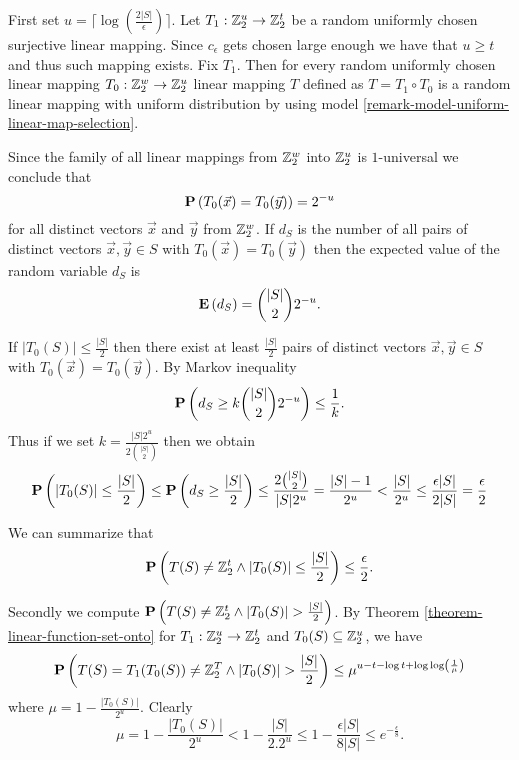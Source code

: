 First set $u = \lceil\log(\frac {2|S|}{\epsilon})\rceil$. Let $T_1: \mathbb{Z}_{2}^{u} \rightarrow \mathbb{Z}_{2}^{t}$ be a random uniformly chosen surjective linear mapping. Since $c_\epsilon$ gets chosen large enough we have that $u \geq t$ and thus such mapping exists.  Fix $T_1$. Then for every random uniformly chosen linear mapping $T_0: \mathbb{Z}_{2}^{w} \rightarrow \mathbb{Z}_{2}^{u}$ linear mapping $T$ defined as $T = T_1 \circ T_0$  is a random linear mapping with uniform distribution by using model \ref{remark-model-uniform-linear-map-selection}. 

Since the family of all linear mappings from $\mathbb{Z}_{2}^{w}$ into $\mathbb{Z}_{2}^{u}$ is $1$-universal we conclude that \[ \mathbf{P}\left(T_0(\vec{x}) = T_0(\vec{y})\right) = 2 ^ {-u} \] for all distinct vectors $\vec {x}$ and $\vec {y}$ from $\mathbb{Z}_{2}^{w}$. If $d_S$ is the number of  all pairs of distinct vectors $\vec {x},\vec {y}\in S$ with $T_0(\vec {x}) = T_0(\vec {y})$ then the expected value of the random variable $d_S$ is \[ \mathbf{E}\left(d_S\right)= \binom{|S|}{2} 2 ^ {-u} \text{.} \]

If $|T_0(S)| \leq \frac {|S|}{2}$ then there exist at least $\frac {|S|}{2}$ pairs of distinct vectors $\vec {x},\vec {y} \in S$ with $T_0(\vec {x}) = T_0(\vec {y}
)$. By Markov inequality \[ \mathbf{P}\left(d_S \geq k\binom {|S|}{2} 2^{-u}\right) \leq \frac{1}{k} \text{.} \]
Thus if we set $k = \frac {|S|2^u}{2\binom {|S|}{2}}$ then we obtain 
\[ 
	\mathbf{P}\left(|T_0(S)| \leq \frac {|S|}{2}\right) 
		\leq \mathbf{P}\left(d_S \geq \frac {|S|}{2}\right) 
		\leq \frac{2 \binom{|S|}{2}}{|S|2^u} = \frac{|S| - 1}{2^u} < \frac{|S|}{2^u} 
		\leq \frac{\epsilon |S|}{2|S|} = \frac{\epsilon}{2}
\]

We can summarize that
\[ 
\mathbf{P}\left(T(S) \neq \mathbb{Z}_{2}^{t} \wedge |T_0(S)| \leq \frac{|S|}{2}\right) \leq \frac{\epsilon}{2} \text{.}
\]

Secondly we compute $\mathbf{P}\left(T(S) \neq \mathbb{Z}_{2}^{t} \wedge |T_0(S)| > \frac{|S|}{2}\right)$. By Theorem \ref{theorem-linear-function-set-onto} for $T_1: \mathbb{Z}_{2}^{u} \rightarrow \mathbb{Z}_{2}^{t}$ and $T_0(S) \subseteq \mathbb{Z}_{2}^{u}$, we have
\[
	\mathbf{P}\left(T(S) = T_1(T_0(S)) \neq \mathbb{Z}_{2}^{T} \wedge |T_0(S)| > \frac{|S|}{2}\right) \leq \mu ^ {u - t - \log t  +\log\log \left(\frac{1}{\mu}\right) } 
\]
where $\mu = 1- \frac{|T_0(S)|}{2^u}$. Clearly
\[
\mu = 1 - \frac{|T_0(S)|}{2 ^ u} < 1 - \frac{|S|}{2 . 2 ^ u} \leq 1 - \frac{\epsilon |S|}{8|S|} \leq e^{-\frac{\epsilon}{8}}
\text{.}
\]


